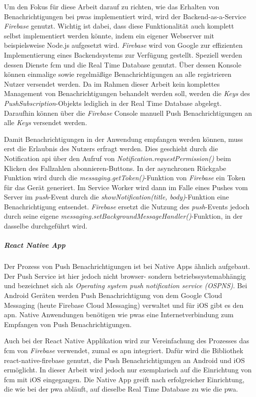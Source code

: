 Um den Fokus für diese Arbeit darauf zu richten, wie das Erhalten von Benachrichtigungen bei \acp{pwa} implementiert wird, wird der Backend-as-a-Service \textit{Firebase} genutzt.
Wichtig ist dabei, dass diese Funktionalität auch komplett selbst implementiert werden könnte, indem ein eigener Webserver mit beispielsweise Node.js aufgesetzt wird.
\textit{Firebase} wird von Google zur effizienten Implementierung eines Backendsystems zur Verfügung gestellt.
Speziell werden dessen Dienste \ac{fcm} und die Real Time Database genutzt.
Über dessen Konsole können einmalige sowie regelmäßige Benachrichtigungen an alle registrieren Nutzer versendet werden.
Da im Rahmen dieser Arbeit kein komplettes Management von Benachrichtigungen behandelt werden soll, werden die \textit{Keys} des \textit{PushSubscription}-Objekts lediglich in der Real Time Database abgelegt.
Daraufhin können über die \textit{Firebase} Console manuell Push Benachrichtigungen an alle \textit{Keys} versendet werden.

Damit Benachrichtigungen in der Anwendung empfangen werden können, muss erst die Erlaubnis des Nutzers erfragt werden.
Dies geschieht durch die Notification \ac{api} über den Aufruf von \textit{Notification.requestPermission()} beim Klicken des \glqq Fallzahlen abonnieren\grqq{}-Buttons.
In der asynchronen Rückgabe Funktion wird durch die \textit{messaging.getToken()}-Funktion von \textit{Firebase} ein Token für das Gerät generiert.
Im Service Worker wird dann im Falle eines Pushes vom Server im \textit{push}-Event durch die \textit{showNotification(title, body)}-Funktion eine Benachrichtigung entsendet.
\textit{Firebase} ersetzt die Nutzung des \textit{push}-Events jedoch durch seine eigene \textit{messaging.setBackgroundMessageHandler()}-Funktion, in der dasselbe durchgeführt wird.

\subparagraph{React Native App\\}
Der Prozess von Push Benachrichtigungen ist bei Native Apps ähnlich aufgebaut.
Der Push Service ist hier jedoch nicht browser- sondern betriebssystemabhängig und bezeichnet sich als \textit{Operating system push notification service (OSPNS)}.
Bei Android Geräten werden Push Benachrichtigung von dem Google Cloud Messaging (heute Firebase Cloud Messaging) verwaltet und für iOS gibt es den \ac{apn}.
Native Anwendungen benötigen wie \acp{pwa} eine Internetverbindung zum Empfangen von Push Benachrichtigungen.

Auch bei der React Native Applikation wird zur Vereinfachung des Prozesses das \ac{fcm} von \textit{Firebase} verwendet, zumal es \ac{apn} integriert.
Dafür wird die Bibliothek \glqq react-native-firebase\grqq{} genutzt, die Push Benachrichtigungen an Android und iOS ermöglicht.
In dieser Arbeit wird jedoch nur exemplarisch auf die Einrichtung von \ac{fcm} mit iOS eingegangen.
Die Native App greift nach erfolgreicher Einrichtung, die wie bei der \ac{pwa} abläuft, auf dieselbe Real Time Database zu wie die \ac{pwa}.

